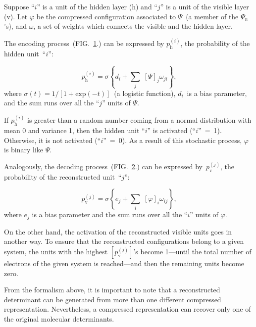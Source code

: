 \documentclass[%
 amsmath,amssymb,
 aps,prl, %
 reprint,%
]{revtex4-1}
\begin{document}
\indent Suppose ``$i$'' is a unit of the hidden layer (h) and ``$j$'' is a unit of the visible layer (v). Let $\varphi$ be the compressed configuration associated to  $\Psi$~(a member of the $\Psi_{n}$'s), and $\omega$, a set of weights which connects the visible and the hidden layer. 

\indent The encoding process~(FIG.~\protect\hyperlink{fig:encoding_process}{1}.) can be expressed by $p_{\text{h}}^{(i)}$, the probability of the hidden unit~``$i$'':~\cite{Smolensky1986,Freund1992,Hinton2012,Hinton2006,Bengio2012,Kingma2013,Chen2017,LeRoux2008,Montufar2011}

\begin{equation}
p_{\text{h}}^{(i)}=\sigma\left\{ d_{i}+\sum_{j}\;\left[\Psi\right]_{j}\omega_{ji}\right\}\text{,} 
\end{equation}
where $\sigma\left(t\right)=1/\left[1+\text{exp}\left(-t\right)\right]$~(a logistic function), $d_{i}$~is a bias parameter, and the sum runs over all the ``$j$'' units of $\Psi$.

\indent If $p_{\text{h}}^{(i)}$ is greater than a random number coming from a normal distribution with mean 0 and variance 1, then the hidden unit ``$i$'' is activated (``$i$''~=~1).~\cite{Hinton2012,Chen2017} Otherwise, it is not activated (``$i$''~=~0). As a result of this stochastic process, $\varphi$ is binary like $\Psi$.

\indent Analogously, the decoding process~(FIG.~\protect\hyperlink{fig:decoding_process}{2}.) can be expressed by~$p_{\text{v}}^{(j)}$, the probability of the reconstructed unit~``$j$'':~\cite{Smolensky1986,Freund1992,Hinton2012,Hinton2006,Bengio2012,Kingma2013,Chen2017,LeRoux2008,Montufar2011}

\begin{equation}
p_{\text{v}}^{(j)}=\sigma\left\{ e_{j}+\sum_{i}\;\left[\varphi\right]_{i}\omega_{ij}\right\}\text{,} 
\end{equation}
where $e_{j}$ is a bias parameter and the sum runs over all the ``$i$'' units of $\varphi$.

\indent On the other hand, the activation of the reconstructed visible units goes in another way. To ensure that the reconstructed configurations belong to a given system, the units with the highest $[p_{\text{v}}^{(j)}]$'s become 1---until the total number of electrons of the given system is reached---and then the remaining units become zero.  

\indent From the formalism above, it is important to note that a reconstructed determinant can be generated from more than one different compressed representation. Nevertheless, a compressed representation can recover only one of the original molecular determinants.
\end{document}
